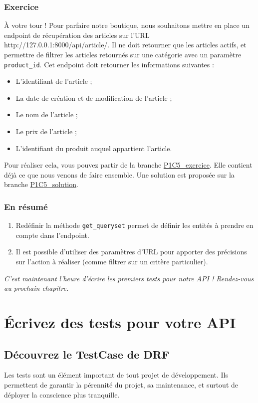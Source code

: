 \documentclass[a4paper]{article}
\begin{document}
\subsubsection*{Exercice}
À votre tour ! Pour parfaire notre boutique, nous souhaitons mettre en place un endpoint de récupération des articles sur l’URL http://127.0.0.1:8000/api/article/. Il ne doit retourner que les articles actifs, et permettre de filtrer les articles retournés sur une catégorie avec un paramètre {\tt product\_id}.
Cet endpoint doit retourner les informations suivantes :
\begin{itemize}
\item L’identifiant de l’article ;
\item La date de création et de modification de l’article ;
\item Le nom de l’article ;
\item Le prix de l’article ;
\item L’identifiant du produit auquel appartient l’article.
\end{itemize}
Pour réaliser cela, vous pouvez partir de la branche \href{https://github.com/OpenClassrooms-Student-Center/7192416\_APIs\_DRF/tree/P1C5\_exercice}{P1C5\_exercice}. Elle contient déjà ce que nous venons de faire ensemble. Une solution est proposée sur la branche \href{https://github.com/OpenClassrooms-Student-Center/7192416\_APIs\_DRF/tree/P1C5\_solution}{P1C5\_solution}.

\subsubsection*{En résumé}
\begin{enumerate}
\item Redéfinir la méthode {\tt get\_queryset}  permet de définir les entités à prendre en compte dans l'endpoint.
\item Il est possible d’utiliser des paramètres d’URL pour apporter des précisions sur l’action à réaliser (comme filtrer sur un critère particulier).
\end{enumerate}

{\em C’est maintenant l’heure d’écrire les premiers tests pour notre API ! Rendez-vous au prochain chapitre.}

\section{Écrivez des tests pour votre API}
\subsection{Découvrez le TestCase de DRF}
Les tests sont un élément important de tout projet de développement. Ils permettent de garantir la pérennité du projet, sa maintenance, et surtout de déployer la conscience plus tranquille.
\end{document}
